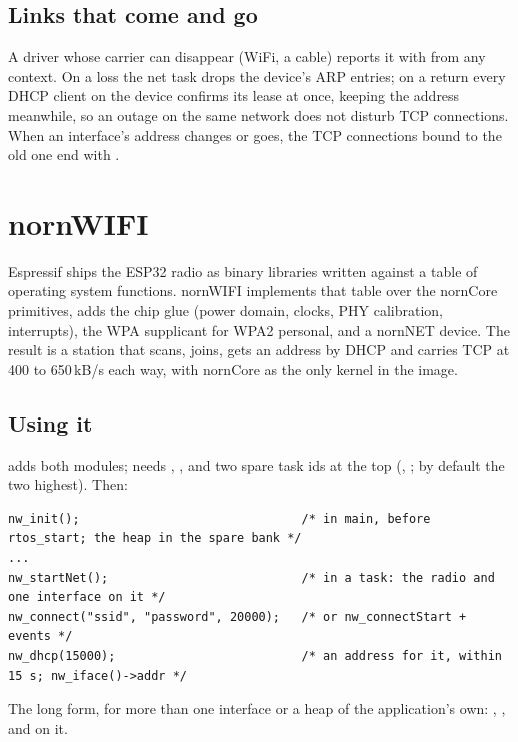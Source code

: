 \subsection{Links that come and go}

A driver whose carrier can disappear (WiFi, a cable) reports it with
 from any context. On a loss the net task drops
the device's ARP entries; on a return every DHCP client on the device confirms its lease
at once, keeping the address meanwhile, so an outage on the same network does not
disturb TCP connections. When an interface's address changes or goes, the TCP connections
bound to the old one end with .

\section{nornWIFI}

Espressif ships the ESP32 radio as binary libraries written against a table of operating
system functions. nornWIFI implements that table over the nornCore primitives, adds the
chip glue (power domain, clocks, PHY calibration, interrupts), the WPA supplicant for
WPA2 personal, and a nornNET device. The result is a station that scans, joins, gets an
address by DHCP and carries TCP at 400 to 650\,kB/s each way, with nornCore as the only
kernel in the image.

\subsection{Using it}

 adds both modules;  needs ,
,  and two spare task ids at
the top (, ; by default the two
highest). Then:

\begin{lstlisting}
nw_init();                               /* in main, before rtos_start; the heap in the spare bank */
...
nw_startNet();                           /* in a task: the radio and one interface on it */
nw_connect("ssid", "password", 20000);   /* or nw_connectStart + events */
nw_dhcp(15000);                          /* an address for it, within 15 s; nw_iface()->addr */
\end{lstlisting}

The long form, for more than one interface or a heap of the application's own:
, ,  and  on it.

